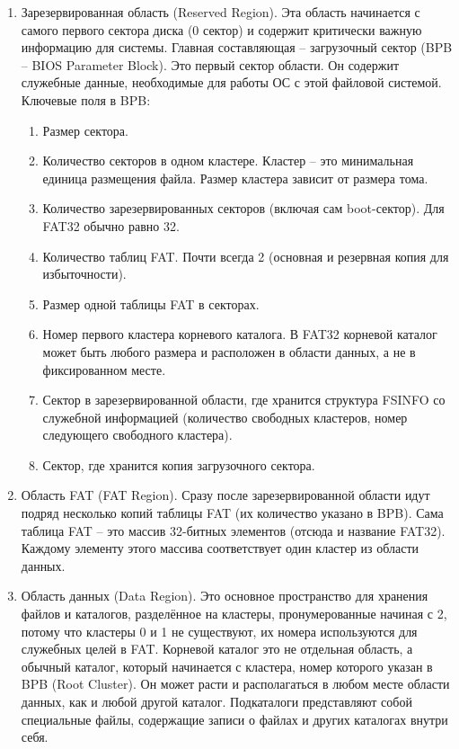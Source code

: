 \begin{enumerate}
\item Зарезервированная область (Reserved Region). Эта область начинается с самого первого сектора диска (0 сектор) и содержит критически важную информацию для системы. Главная составляющая -- загрузочный сектор (BPB -- BIOS Parameter Block). Это первый сектор области. Он содержит служебные данные, необходимые для работы ОС с этой файловой системой. Ключевые поля в BPB:
\begin{enumerate}
\item Размер сектора.
\item Количество секторов в одном кластере. Кластер -- это минимальная единица размещения файла. Размер кластера зависит от размера тома.
\item Количество зарезервированных секторов (включая сам boot-сектор). Для FAT32 обычно равно 32.
\item Количество таблиц FAT. Почти всегда 2 (основная и резервная копия для избыточности).
\item Размер одной таблицы FAT в секторах.
\item Номер первого кластера корневого каталога. В FAT32 корневой каталог может быть любого размера и расположен в области данных, а не в фиксированном месте.
\item Сектор в зарезервированной области, где хранится структура FSINFO со служебной информацией (количество свободных кластеров, номер следующего свободного кластера).
\item Сектор, где хранится копия загрузочного сектора.
\end{enumerate}
\item Область FAT (FAT Region). Сразу после зарезервированной области идут подряд несколько копий таблицы FAT (их количество указано в BPB). Сама таблица FAT -- это массив 32-битных элементов (отсюда и название FAT32). Каждому элементу этого массива соответствует один кластер из области данных.
\item Область данных (Data Region). Это основное пространство для хранения файлов и каталогов, разделённое на кластеры, пронумерованные начиная с 2, потому что кластеры 0 и 1 не существуют, их номера используются для служебных целей в FAT. Корневой каталог это не отдельная область, а обычный каталог, который начинается с кластера, номер которого указан в BPB (Root Cluster). Он может расти и располагаться в любом месте области данных, как и любой другой каталог. Подкаталоги представляют собой специальные файлы, содержащие записи о файлах и других каталогах внутри себя.
\end{enumerate}

